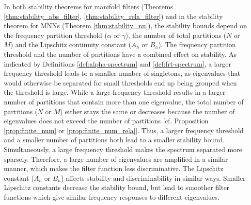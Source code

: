 

{}
In both stability theorems for manifold filters (Theorems \ref{thm:stability_abs_filter}, \ref{thm:stability_rela_filter}) and in the stability theorem for MNNs (Theorem \ref{thm:stability_nn}), the stability  bounds depend on the frequency partition threshold ($\alpha$ or $\gamma$), the number of total partitions ($N$ or $M$) and the Lipschitz continuity constant ($A_h$ or $B_h$). 
The frequency partition threshold and the number of partitions have a combined effect on stability. As indicated by Definitions \ref{def:alpha-spectrum} and \ref{def:frt-spectrum}, a larger frequency threshold leads to a smaller number of singletons, as eigenvalues that would otherwise be separated for small thresholds end up being grouped when the threshold is large. While a large frequency threshold results in a larger number of partitions that contain more than one eigenvalue, the total number of partitions ($N$ or $M$) either stays the same or decreases because the number of eigenvalues does not exceed the number of partitions [cf. Proposition \ref{prop:finite_num} or \ref{prop:finite_num_rela}]. Thus, a larger frequency threshold and a smaller number of partitions both lead to a smaller stability bound. Simultaneously, a large frequency threshold makes the spectrum separated more sparsely. Therefore, a large number of eigenvalues are amplified in a similar manner, which makes the filter function less discriminative. The Lipschitz constant ($A_h$ or $B_h$) affects stability and discriminability in similar ways. Smaller Lipschitz constants decrease the stability bound, but lead to smoother filter functions which give similar frequency responses to different eigenvalues.
